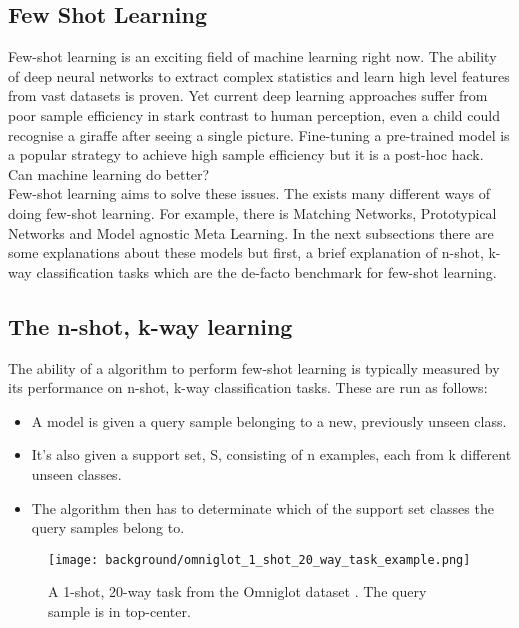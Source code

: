 
\subsection{Few Shot Learning}

Few-shot learning is an exciting field of machine learning right now. The ability of deep neural networks to extract complex statistics and learn high level features from vast datasets is proven. Yet current deep learning approaches suffer from poor sample efficiency in stark contrast to human perception, even a child could recognise a giraffe after seeing a single picture. Fine-tuning a pre-trained model is a popular strategy to achieve high sample efficiency but it is a post-hoc hack. Can machine learning do better? \\

Few-shot learning aims to solve these issues. The exists many different ways of doing few-shot learning. For example, there is Matching Networks, Prototypical Networks and Model agnostic Meta Learning. In the next subsections there are some explanations about these models but first, a brief explanation of n-shot, k-way classification tasks which are the de-facto benchmark for few-shot learning.

\subsection{The n-shot, k-way learning}

The ability of a algorithm to perform few-shot learning is typically measured by its performance on n-shot, k-way classification tasks. These are run as follows: 

\begin{itemize}
    \item A model is given a query sample belonging to a new, previously unseen class.
    \item It’s also given a support set, S, consisting of n examples, each from k different unseen classes.
    \item The algorithm then has to determinate which of the support set classes the query samples belong to.
\end{itemize}

\begin{figure}[!ht]
    \centering
    \texttt{[image: background/omniglot\_1\_shot\_20\_way\_task\_example.png]}
    \caption{A 1-shot, 20-way task from the Omniglot dataset \cite{omniglot}. The query sample is in top-center.}
    \label{figure:background:omniglot_sample}
\end{figure}

